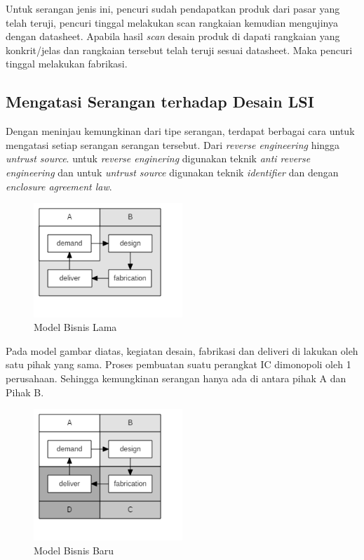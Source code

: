 Untuk serangan jenis ini, pencuri sudah pendapatkan produk dari pasar yang telah teruji, pencuri tinggal melakukan scan rangkaian kemudian mengujinya dengan datasheet. Apabila hasil \textit{scan} desain produk di dapati rangkaian yang konkrit/jelas dan rangkaian tersebut telah teruji sesuai datasheet. Maka pencuri tinggal melakukan fabrikasi.

% 

\subsection{Mengatasi Serangan terhadap Desain LSI}
Dengan meninjau kemungkinan dari tipe serangan, terdapat berbagai cara untuk mengatasi setiap serangan serangan tersebut. Dari \textit{reverse engineering} hingga \textit{untrust source}. untuk \textit{reverse enginering} digunakan teknik \textit{anti reverse engineering} dan untuk \textit{untrust source} digunakan teknik \textit{identifier} dan dengan \textit{enclosure agreement law}.

\begin{figure}
	\centering
	\includegraphics[width=0.5\textwidth]
	{diagrams/oldBusinessLSI.png}
	\caption{Model Bisnis Lama}
	\label{fig:oldbiss}
\end{figure}

Pada model gambar diatas, kegiatan desain, fabrikasi dan deliveri di lakukan oleh satu pihak yang sama. Proses pembuatan suatu perangkat IC dimonopoli oleh 1 perusahaan. Sehingga kemungkinan serangan hanya ada di antara pihak A dan Pihak B.

\begin{figure}
	\centering
	\includegraphics[width=0.5\textwidth]
	{diagrams/newBusinessLSI.png}
	\caption{Model Bisnis Baru}
	\label{fig:newbiss}
\end{figure}

